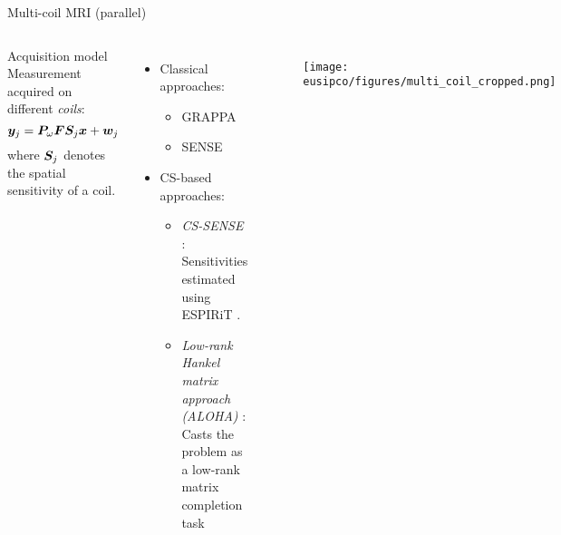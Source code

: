 \begin{frame}{Multi-coil MRI (parallel)}

\begin{columns}[T]

\begin{block}{Acquisition model}
Measurement acquired on different \textit{coils}:
$${\bm{y}}_j = {\bm{P}}_\omega {\bm{F}}{\bm{S}}_j {\bm{x}} + {\bm{w}}_j$$
where ${\bm{S}}_j$ denotes the spatial sensitivity of a coil.
\end{block}

\begin{itemize}
\item Classical approaches:
\begin{itemize}
\item  GRAPPA \cite{griswold2002generalized}
\item SENSE \cite{pruessmann1999sense}  \\[2mm]
\end{itemize}
\item CS-based approaches:
\begin{itemize}
\item \textit{CS-SENSE} \cite{liang2009accelerating}: \\
Sensitivities estimated using  ESPIRiT \cite{uecker2014espirit}. \\[2mm]
\item\textit{Low-rank Hankel matrix approach (ALOHA)} \cite{jin2016general}:\\
Casts the problem as a low-rank matrix completion task\\[2mm]
\end{itemize}
\end{itemize}
	

\begin{figure}
  \centerline{\texttt{[image: eusipco/figures/multi\_coil\_cropped.png]}}
  \end{figure}
\end{columns}
\end{frame}

